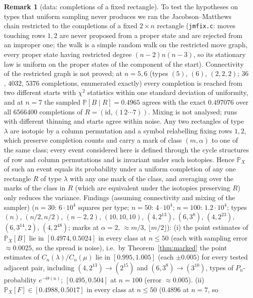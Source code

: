\documentclass[11pt]{article}
\theoremstyle{definition}
\newtheorem{remark}[theorem]{Remark}
\renewcommand{\Pr}{\mathbb{P}}
\newcommand{\PP}{P}
\newcommand{\CC}{C}
\begin{document}
\begin{remark}[data: completions of a fixed rectangle]\label{rem:fixrect}
To test the hypotheses on types that uniform sampling never produces we ran the
Jacobson--Matthews chain restricted to the completions of a fixed $2\times n$ rectangle
(\texttt{jmfix.c}: moves touching rows $1,2$ are never proposed from a proper state and are
rejected from an improper one; the walk is a simple random walk on the restricted move
graph, every proper state having restricted degree $(n-2)n(n-3)$, so its stationary law is
uniform on the proper states of the component of the start).  Connectivity of the restricted
graph is not proved; at $n=5,6$ (types $(5)$, $(6)$, $(2,2,2)$; $36$, $4032$, $5376$
completions, enumerated exactly) every completion is reached from two different starts with
$\chi^2$ statistics within one standard deviation of uniformity, and at $n=7$ the sampled
$\Pr[B\mid R]=0.4965$ agrees with the exact $0.497076$ over all $6566400$ completions of
$R=(\mathrm{id},(1\,2\cdots7))$.  Mixing is not analysed; runs with different thinning
and starts agree within noise.  Any two rectangles of type $\lambda$ are isotopic by a
column permutation and a symbol relabelling fixing rows $1,2$, which preserve completion
counts and carry a mark of class $(m,\alpha)$ to one of the same class; every event
considered here is defined through the cycle structures of row and column permutations and
is invariant under such isotopies.  Hence $\Pr_X$ of such an event equals its probability
under a uniform completion of any one rectangle $R$ of type $\lambda$ with any one mark of
the class, and averaging over the marks of the class in $R$ (which are equivalent under the
isotopies preserving $R$) only reduces the variance.  Findings (assuming connectivity and
mixing of the sampler) ($n=30$: $6\cdot10^4$ squares per type; $n=50$: $4\cdot10^4$;
$n=100$: $1.2\cdot10^4$; types $(n)$, $(n/2,n/2)$, $(n-2,2)$, $(10,10,10)$, $(4,2^{13})$,
$(6,3^8)$, $(4,2^{23})$, $(6,3^{14},2)$, $(4,2^{48})$; marks at $\alpha=2$,
$\approx m/3$, $\lfloor m/2\rfloor$):
(i) the point estimates of $\Pr_X[B]$ lie in $[0.4974,0.5024]$ in every class at
$n\le50$ (each with sampling error $\approx0.0025$, so the spread is noise), i.e.\ by
Theorem~\ref{thm:marked} the point estimates of $\CC_n(\lambda)/\CC_n(\mu)$ lie in
$[0.995,1.005]$ (each $\pm0.005$) for every tested adjacent pair, including
$(4,2^{13})\to(2^{15})$ and $(6,3^8)\to(3^{10})$, types of $\PP_n$-probability
$e^{-\Theta(n)}$; $[0.495,0.504]$ at $n=100$ (error $\approx0.005$).
(ii) $\Pr_X[F]\in[0.4988,0.5017]$ in every class at $n\le50$ ($0.4896$ at $n=7$, so

\end{remark}
\end{document}
